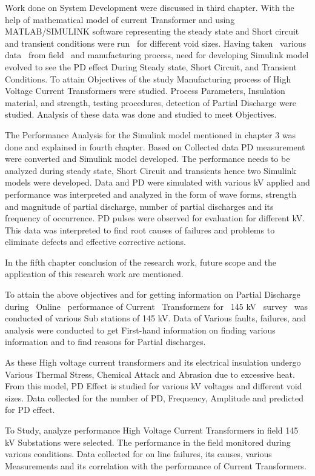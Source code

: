 Work done on System Development were discussed in third chapter. With the help of mathematical model of current Transformer and using MATLAB/SIMULINK software representing the steady state and Short circuit and transient conditions were run ~for different void sizes. Having taken ~various data ~from field ~and manufacturing process, need for developing Simulink model evolved to see the PD effect During Steady state, Short Circuit, and Transient Conditions. To attain Objectives of the study Manufacturing process of High Voltage Current Transformers were studied. Process Parameters, Insulation material, and strength, testing procedures, detection of Partial Discharge were studied. Analysis of these data was done and studied to meet Objectives. 

The Performance Analysis for the Simulink model mentioned in chapter 3 was done and explained in fourth chapter. Based on Collected data PD measurement were converted and Simulink model developed. The performance needs to be analyzed during steady state, Short Circuit and transients hence two Simulink models were developed. Data and PD were simulated with various kV applied and performance was interpreted and analyzed in the form of wave forms, strength and magnitude of partial discharge, number of partial discharges and its frequency of occurrence. PD pulses were observed for evaluation for different kV. This data was interpreted to find root causes of failures and problems to eliminate defects and effective corrective actions.

In the fifth chapter conclusion of the research work, future scope and the application of this research work are mentioned. 

To attain the above objectives and for getting information on Partial Discharge during ~Online ~performance of Current ~Transformers for ~145 kV ~survey ~was conducted of various Sub stations of 145 kV. Data of Various faults, failures, and analysis were conducted to get First-hand information on finding various information and to find reasons for Partial discharges.

As these High voltage current transformers and its electrical insulation undergo Various Thermal Stress, Chemical Attack and Abrasion due to excessive heat. From this model, PD Effect is studied for various kV voltages and different void sizes. Data collected for the number of PD, Frequency, Amplitude and predicted for PD effect. 

To Study, analyze performance High Voltage Current Transformers in field 145 kV Substations were selected. The performance in the field monitored during various conditions. Data collected for on line failures, its causes, various Measurements and its correlation with the performance of Current Transformers.

